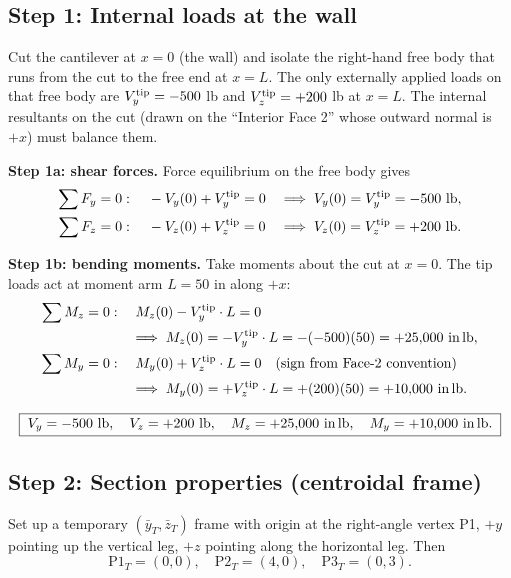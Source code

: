 \documentclass[11pt]{article}
\begin{document}
\subsection*{Step 1: Internal loads at the wall}

Cut the cantilever at $x = 0$ (the wall) and isolate the right-hand free body that runs from the cut to the free end at $x = L$. The only externally applied loads on that free body are $V_y^{\rm tip} = -500$ lb and $V_z^{\rm tip} = +200$ lb at $x = L$. The internal resultants on the cut (drawn on the ``Interior Face 2'' whose outward normal is $+x$) must balance them.

\textbf{Step 1a: shear forces.} Force equilibrium on the free body gives
\begin{align*}
\sum F_y = 0:\quad &\;-V_y(0) + V_y^{\rm tip} = 0 &&\Longrightarrow\; V_y(0) = V_y^{\rm tip} = -500\ \text{lb},\\
\sum F_z = 0:\quad &\;-V_z(0) + V_z^{\rm tip} = 0 &&\Longrightarrow\; V_z(0) = V_z^{\rm tip} = +200\ \text{lb}.
\end{align*}

\textbf{Step 1b: bending moments.} Take moments about the cut at $x=0$. The tip loads act at moment arm $L = 50$ in along $+x$:
\begin{align*}
\sum M_z = 0:\quad &\; M_z(0) - V_y^{\rm tip}\cdot L = 0 \\
&\Longrightarrow\; M_z(0) = -V_y^{\rm tip}\cdot L = -(-500)(50) = +25{,}000\ \text{in\,lb},\\
\sum M_y = 0:\quad &\; M_y(0) + V_z^{\rm tip}\cdot L = 0\quad\text{(sign from Face-2 convention)} \\
&\Longrightarrow\; M_y(0) = +V_z^{\rm tip}\cdot L = +(200)(50) = +10{,}000\ \text{in\,lb}.
\end{align*}

\[
\boxed{\;V_y = -500\ \text{lb},\quad V_z = +200\ \text{lb},\quad M_z = +25{,}000\ \text{in\,lb},\quad M_y = +10{,}000\ \text{in\,lb}.\;}
\]

\subsection*{Step 2: Section properties (centroidal frame)}

Set up a temporary $(\bar y_T, \bar z_T)$ frame with origin at the right-angle vertex P1, $+y$ pointing up the vertical leg, $+z$ pointing along the horizontal leg. Then
\[
\text{P1}_T = (0,0),\quad \text{P2}_T = (4,0),\quad \text{P3}_T = (0,3).
\]
\end{document}
